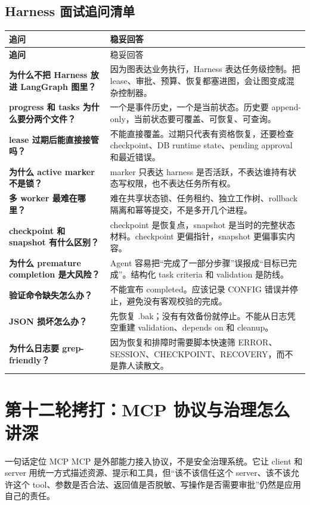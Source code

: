\subsection{Harness 面试追问清单}
\begin{longtable}{>{\bfseries}p{}p{}}
\toprule
追问 & 稳妥回答 \\
\midrule
\endfirsthead
\toprule
追问 & 稳妥回答 \\
\midrule
\endhead
为什么不把 Harness 放进 LangGraph 图里？ & 因为图表达业务执行，Harness 表达任务级控制。把 lease、审批、预算、恢复都塞进图，会让图变成混杂控制器。 \\
progress 和 tasks 为什么要分两个文件？ & 一个是事件历史，一个是当前状态。历史要 append-only，当前状态要可覆盖、可恢复、可查询。 \\
lease 过期后能直接接管吗？ & 不能直接覆盖。过期只代表有资格恢复，还要检查 checkpoint、DB runtime state、pending approval 和最近错误。 \\
为什么 active marker 不是锁？ & marker 只表达 harness 是否活跃，不表达谁持有状态写权限，也不表达任务所有权。 \\
多 worker 最难在哪里？ & 难在共享状态锁、任务租约、独立工作树、rollback 隔离和幂等提交，不是多开几个进程。 \\
checkpoint 和 snapshot 有什么区别？ & checkpoint 是恢复点，snapshot 是当时的完整状态材料。checkpoint 更偏指针，snapshot 更偏事实内容。 \\
为什么 premature completion 是大风险？ & Agent 容易把“完成了一部分步骤”误报成“目标已完成”。结构化 task criteria 和 validation 是防线。 \\
验证命令缺失怎么办？ & 不能宣布 completed。应该记录 CONFIG 错误并停止，避免没有客观校验的完成。 \\
JSON 损坏怎么办？ & 先恢复 .bak；没有有效备份就停止。不能从日志凭空重建 validation、depends on 和 cleanup。 \\
为什么日志要 grep-friendly？ & 因为恢复和排障时需要脚本快速筛 ERROR、SESSION、CHECKPOINT、RECOVERY，而不是靠人读散文。 \\
\bottomrule
\end{longtable}

\section{第十二轮拷打：MCP 协议与治理怎么讲深}

\begin{summaryBox}{一句话定位 MCP}
MCP 是外部能力接入协议，不是安全治理系统。它让 client 和 server 用统一方式描述资源、提示和工具，但“该不该信任这个 server、该不该允许这个 tool、参数是否合法、返回值是否脱敏、写操作是否需要审批”仍然是应用自己的责任。
\end{summaryBox}

